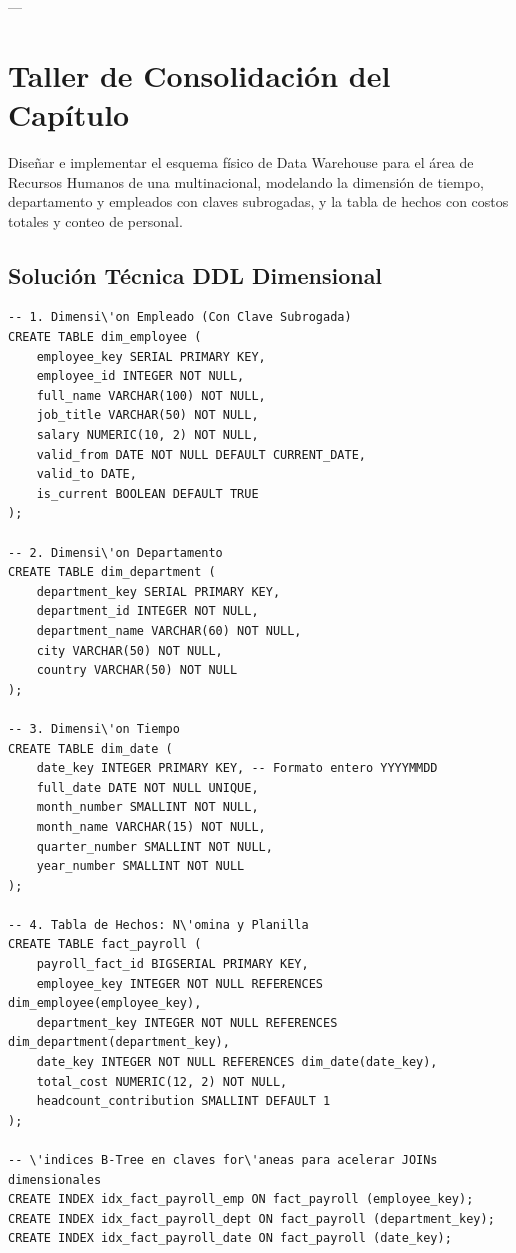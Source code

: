 ---

\section{Taller de Consolidaci\'on del Cap\'itulo}

\begin{businessproblem}
Dise\~nar e implementar el esquema f\'isico de Data Warehouse para el \'area de Recursos Humanos de una multinacional, modelando la dimensi\'on de tiempo, departamento y empleados con claves subrogadas, y la tabla de hechos con costos totales y conteo de personal.
\end{businessproblem}

\subsection{Soluci\'on T\'ecnica DDL Dimensional}

\begin{lstlisting}[style=sqlstyle, caption={Esquema estrella DDL para Data Warehouse de RRHH}]
-- 1. Dimensi\'on Empleado (Con Clave Subrogada)
CREATE TABLE dim_employee (
    employee_key SERIAL PRIMARY KEY,
    employee_id INTEGER NOT NULL,
    full_name VARCHAR(100) NOT NULL,
    job_title VARCHAR(50) NOT NULL,
    salary NUMERIC(10, 2) NOT NULL,
    valid_from DATE NOT NULL DEFAULT CURRENT_DATE,
    valid_to DATE,
    is_current BOOLEAN DEFAULT TRUE
);

-- 2. Dimensi\'on Departamento
CREATE TABLE dim_department (
    department_key SERIAL PRIMARY KEY,
    department_id INTEGER NOT NULL,
    department_name VARCHAR(60) NOT NULL,
    city VARCHAR(50) NOT NULL,
    country VARCHAR(50) NOT NULL
);

-- 3. Dimensi\'on Tiempo
CREATE TABLE dim_date (
    date_key INTEGER PRIMARY KEY, -- Formato entero YYYYMMDD
    full_date DATE NOT NULL UNIQUE,
    month_number SMALLINT NOT NULL,
    month_name VARCHAR(15) NOT NULL,
    quarter_number SMALLINT NOT NULL,
    year_number SMALLINT NOT NULL
);

-- 4. Tabla de Hechos: N\'omina y Planilla
CREATE TABLE fact_payroll (
    payroll_fact_id BIGSERIAL PRIMARY KEY,
    employee_key INTEGER NOT NULL REFERENCES dim_employee(employee_key),
    department_key INTEGER NOT NULL REFERENCES dim_department(department_key),
    date_key INTEGER NOT NULL REFERENCES dim_date(date_key),
    total_cost NUMERIC(12, 2) NOT NULL,
    headcount_contribution SMALLINT DEFAULT 1
);

-- \'indices B-Tree en claves for\'aneas para acelerar JOINs dimensionales
CREATE INDEX idx_fact_payroll_emp ON fact_payroll (employee_key);
CREATE INDEX idx_fact_payroll_dept ON fact_payroll (department_key);
CREATE INDEX idx_fact_payroll_date ON fact_payroll (date_key);
\end{lstlisting}

